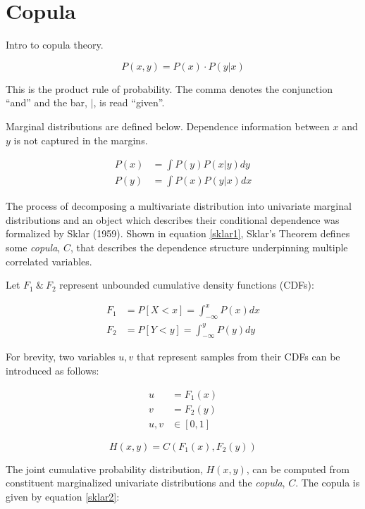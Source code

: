 \section{Copula}

Intro to copula theory.

\begin{equation}
P(x, y) = P(x) \cdot P(y | x)
\label{joint_voi}
\end{equation}

This is the product rule of probability.  The comma denotes the conjunction
``and'' and the bar, $|$, is read ``given''.

Marginal distributions are defined below. Dependence information between $x$
and $y$ is not captured in the margins.

\begin{align*}
    P(x) &= \int P(y) P(x|y) dy \\ P(y) &= \int P(x) P(y|x) dx
\end{align*}

The process of decomposing a multivariate distribution into univariate marginal
distributions and an object which describes their conditional dependence was
formalized by Sklar (1959).  Shown in equation \ref{sklar1},  Sklar's Theorem
defines some \emph{copula}, $C$, that describes the dependence structure
underpinning multiple correlated variables.

Let $F_1\ \&\ F_2$ represent unbounded cumulative density functions (CDFs):

\begin{align*} 
F_1 &= P[X < x] = \int_{-\infty}^x P(x)dx \\
F_2 &= P[Y < y] = \int_{-\infty}^y P(y)dy
\end{align*}

For brevity, two variables $u, v$ that represent samples from their CDFs can be
introduced as follows:

\begin{align*} u &= F_1(x) \\ v &= F_2(y) \\ u,v &\in
[0, 1]
\end{align*}

\begin{equation}
H(x,y) = C(F_1(x), F_2(y))
\label{sklar1}
\end{equation}

The joint cumulative probability distribution, $H(x,y)$, can be computed from
constituent marginalized univariate distributions and the \emph{copula}, $C$.
The copula is given by equation \ref{sklar2}:


